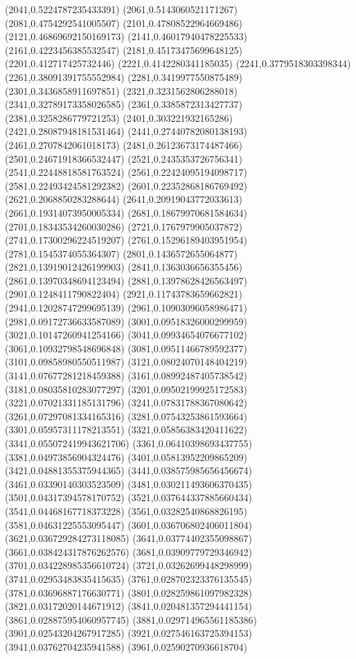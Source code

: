 {(2041,0.5224787235433391)
(2061,0.5143060521171267)
(2081,0.4754292541005507)
(2101,0.47808522964669486)
(2121,0.46869692150169173)
(2141,0.46017940478225533)
(2161,0.4223456385532547)
(2181,0.45173475699648125)
(2201,0.412717425732446)
(2221,0.4142280341185035)
(2241,0.3779518303398344)
(2261,0.38091391755552984)
(2281,0.3419977550875489)
(2301,0.3436858911697851)
(2321,0.3231562806288018)
(2341,0.32789173358026585)
(2361,0.3385872313427737)
(2381,0.3258286779721253)
(2401,0.303221932165286)
(2421,0.28087948181531464)
(2441,0.27440782080138193)
(2461,0.2707842061018173)
(2481,0.26123673174487466)
(2501,0.24671918366532447)
(2521,0.2435353726756341)
(2541,0.22448818581763524)
(2561,0.22424095194098717)
(2581,0.22493424581292382)
(2601,0.22352868186769492)
(2621,0.2068850283288644)
(2641,0.20919043772033613)
(2661,0.19314073950005334)
(2681,0.18679970681584634)
(2701,0.18343534260030286)
(2721,0.1767979905037872)
(2741,0.17300296224519207)
(2761,0.15296189403951954)
(2781,0.1545374055364307)
(2801,0.1436572655064877)
(2821,0.13919012426199903)
(2841,0.1363036656355456)
(2861,0.13970348694123494)
(2881,0.13978628426563497)
(2901,0.1248411790822404)
(2921,0.11743783659662821)
(2941,0.12028747299695139)
(2961,0.10903096058986471)
(2981,0.09172736633587089)
(3001,0.09518326000299959)
(3021,0.10147260941254166)
(3041,0.09934654076677102)
(3061,0.10932798548696848)
(3081,0.09511466789592377)
(3101,0.09858980550511987)
(3121,0.08024070148404219)
(3141,0.07677281218459388)
(3161,0.08992487405738542)
(3181,0.08035810283077297)
(3201,0.09502199925172583)
(3221,0.07021331185131796)
(3241,0.07831788367080642)
(3261,0.07297081334165316)
(3281,0.07543253861593664)
(3301,0.05957311178213551)
(3321,0.05856383420411622)
(3341,0.055072419943621706)
(3361,0.06410398693437755)
(3381,0.04973856904324476)
(3401,0.05813952209865209)
(3421,0.04881355375944365)
(3441,0.038575985656456674)
(3461,0.03390140303523509)
(3481,0.030211493606370435)
(3501,0.04317394578170752)
(3521,0.037644337885660434)
(3541,0.04468167718373228)
(3561,0.03282540868826195)
(3581,0.04631225553095447)
(3601,0.036706802406011804)
(3621,0.036729284273118085)
(3641,0.03774402355098867)
(3661,0.038424317876262576)
(3681,0.03909779729346942)
(3701,0.034228985356610724)
(3721,0.03262699448298999)
(3741,0.02953483835415635)
(3761,0.028702323376135545)
(3781,0.03696887176630771)
(3801,0.028259861097982328)
(3821,0.03172020144671912)
(3841,0.020481357294441154)
(3861,0.028875954060957745)
(3881,0.029714965561185386)
(3901,0.02543204267917285)
(3921,0.027546163725394153)
(3941,0.03762704235941588)
(3961,0.02590270936618704)
}
